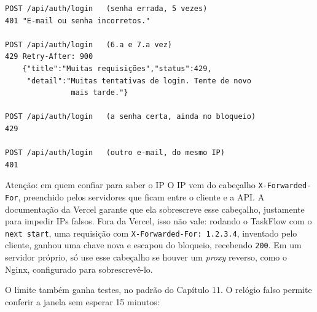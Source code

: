 \begin{codigo}
\begin{Verbatim}[breaklines=true, breaksymbolleft={}, fontsize=\footnotesize]
POST /api/auth/login   (senha errada, 5 vezes)
401 "E-mail ou senha incorretos."

POST /api/auth/login   (6.a e 7.a vez)
429 Retry-After: 900
    {"title":"Muitas requisições","status":429,
     "detail":"Muitas tentativas de login. Tente de novo
               mais tarde."}

POST /api/auth/login   (a senha certa, ainda no bloqueio)
429

POST /api/auth/login   (outro e-mail, do mesmo IP)
401
\end{Verbatim}
\end{codigo}

\begin{destaque}{Atenção: em quem confiar para saber o IP}
O IP vem do cabeçalho \texttt{X-Forwarded-For}, preenchido pelos servidores que ficam entre o cliente e a API. A documentação da Vercel garante que ela sobrescreve esse cabeçalho, justamente para impedir IPs falsos. Fora da Vercel, isso não vale: rodando o TaskFlow com o \texttt{next start}, uma requisição com \texttt{X-Forwarded-For: 1.2.3.4}, inventado pelo cliente, ganhou uma chave nova e escapou do bloqueio, recebendo \texttt{200}. Em um servidor próprio, só use esse cabeçalho se houver um \textit{proxy} reverso, como o Nginx, configurado para sobrescrevê-lo.
\end{destaque}

O limite também ganha testes, no padrão do Capítulo 11. O relógio falso permite conferir a janela sem esperar 15 minutos:

